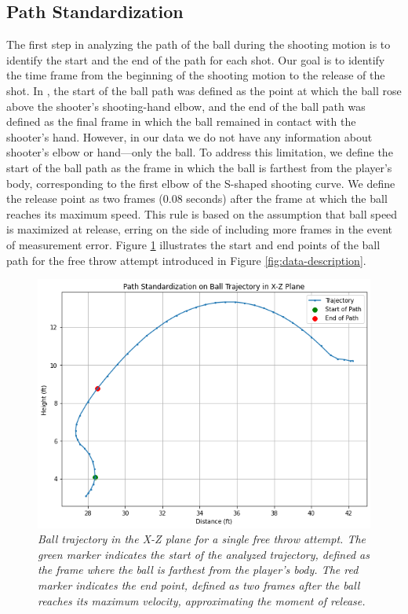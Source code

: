 \documentclass{article}
\begin{document}
    \subsection{Path Standardization}

      The first step in analyzing the path of the ball during the shooting motion is to identify the start and the end of the path for each shot. Our goal is to identify the time frame from the beginning of the shooting motion to the release of the shot. In \citep{slegers_role_2024}, the start of the ball path was defined as the point at which the ball rose above the shooter's shooting-hand elbow, and the end of the ball path was defined as the final frame in which the ball remained in contact with the shooter's hand. However, in our data we do not have any information about shooter's elbow or hand---only the ball. To address this limitation, we define the start of the ball path as the frame in which the ball is farthest from the player's body, corresponding to the first elbow of the S-shaped shooting curve. We define the release point as two frames (0.08 seconds) after the frame at which the ball reaches its maximum speed. This rule is based on the assumption that ball speed is maximized at release, erring on the side of including more frames in the event of measurement error. Figure \ref{fig:path-standardization} illustrates the start and end points of the ball path for the free throw attempt introduced in Figure \ref{fig:data-description}.

      \begin{figure}[H]
        \centering
        \includegraphics[scale=0.4]{reports/arxiv/path_standardization.png}
        \caption{\it Ball trajectory in the X-Z plane for a single free throw attempt. The green marker indicates the start of the analyzed trajectory, defined as the frame where the ball is farthest from the player’s body. The red marker indicates the end point, defined as two frames after the ball reaches its maximum velocity, approximating the moment of release.}
        \label{fig:path-standardization}
      \end{figure}
\end{document}
